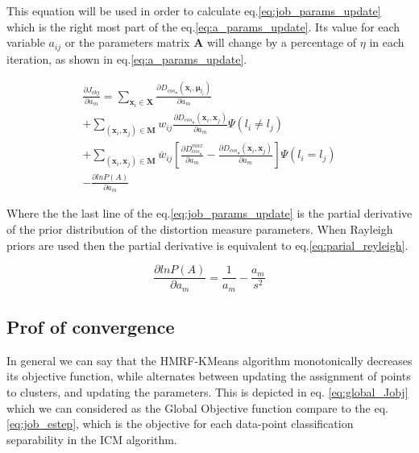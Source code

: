 \documentclass[dvips,dvipdfm,pdftex]{llncs}
\begin{document}
This equation will be used in order to calculate eq.\ref{eq:job_params_update} which is the right most part of the eq.\ref{eq:a_params_update}. Its value for each variable $a_{ij}$ or the parameters matrix $\mathbf{A}$ will change by a percentage of $\eta$ in each iteration, as shown in eq.\ref{eq:a_params_update}.

\begin{equation}
	\begin{split}
	\frac{\partial J_{obj}}{\partial a_{m}}=\sum_{\mathbf{x}_{i}\in\mathbf{X}}\frac{\partial D_{cos_{\mathbf{a}}}(\mathbf{x}_{i},\mathbf{\mu}_{l_{i}})}{\partial a_{m}}\\
		+\sum_{(\mathbf{x}_{i},\mathbf{x}_{j})\in\mathbf{M}}w_{ij}\frac{\partial D_{cos_{\mathbf{a}}}(\mathbf{x}_{i},\mathbf{x}_{j})}{\partial a_{m}}\Psi(l_{i}\neq l_{j})\\
		+\sum_{(\mathbf{x}_{i},\mathbf{x}_{j})\in\mathbf{M}}\overline{w}_{ij}\left[\frac{\partial D_{cos_{\mathbf{a}}}^{max}}{\partial a_{m}}-\frac{\partial D_{cos_{\mathbf{a}}}(\mathbf{x}_{i},\mathbf{x}_{j})}{\partial a_{m}}\right]\Psi(l_{i}=l_{j})\\
		-\frac{\partial lnP(A)}{\partial a_{m}}
	\end{split}
\label{eq:job_params_update}
\end{equation}

Where the the last line of the eq.\ref{eq:job_params_update} is the partial derivative of the prior distribution of the distortion measure parameters. When Rayleigh priors are used then the partial derivative is equivalent to eq.\ref{eq:parial_reyleigh}.

\begin{equation}
	\frac{\partial lnP(A)}{\partial a_{m}} = \frac{1}{a_{m}}-\frac{a_{m}}{s^{2}}
\label{eq:parial_reyleigh}
\end{equation}

\subsection{Prof of convergence}
In general we can say that the HMRF-KMeans algorithm monotonically decreases its objective function, while alternates between updating the assignment of points to clusters, and updating the parameters. This is depicted in eq. \ref{eq:global_Jobj} which we can considered as the Global Objective function compare to the eq.\ref{eq:job_estep}, which is the objective for each data-point classification separability in the ICM algorithm.
\end{document}
